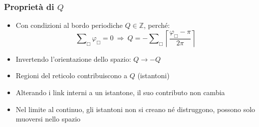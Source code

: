\begin{frame}
    \frametitle{Proprietà di $Q$}
    \begin{itemize}
        \item Con condizioni al bordo periodiche $Q \in \mathbb Z$, perché:
            $$\sum\nolimits_\Box\varphi_\Box=0\ \Longrightarrow\ %
            Q=-\sum\nolimits_\Box\left\lceil\frac{\varphi_\Box-\pi}{2\pi}\right\rceil$$
        \item Invertendo l'orientazione dello spazio: $Q \to -Q$
        \item Regioni del reticolo contribuiscono a $Q$ ({\color{fzjblue}istantoni})
        \item Alterando i link interni a un istantone, il suo contributo non cambia
        \item Nel limite al continuo, gli istantoni non si creano né distruggono, %
            possono solo muoversi nello spazio
    \end{itemize}
\end{frame}

